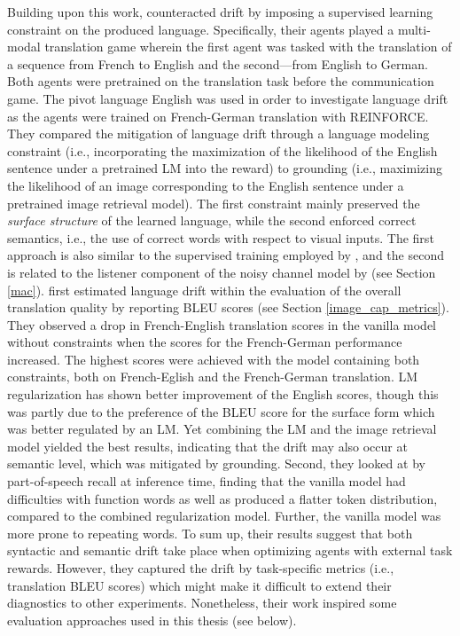 Building upon this work, \cite{lee2019countering} counteracted drift by imposing a supervised learning constraint on the produced language. Specifically, their agents played a multi-modal translation game wherein the first agent was tasked with the translation of a sequence from French to English and the second---from English to German. Both agents were pretrained on the translation task before the communication game. The pivot language English was used in order to investigate language drift as the agents were trained on French-German translation with REINFORCE. They compared the mitigation of language drift through a language modeling constraint (i.e., incorporating the maximization of the likelihood of the English sentence under a pretrained LM into the reward) to grounding (i.e., maximizing the likelihood of an image corresponding to the English sentence under a pretrained image retrieval model). The first constraint mainly preserved the \textit{surface structure} of the learned language, while the second enforced correct semantics, i.e., the use of correct words with respect to visual inputs. The first approach is also similar to the supervised training employed by \cite{lewis2017deal}, and the second is related to the listener component of the noisy channel model by \cite{lazaridou2020multi} (see Section \ref{mac}).
\cite{lee2019countering} first estimated language drift within the evaluation of the overall translation quality by reporting BLEU scores (see Section \ref{image_cap_metrics}). They observed a drop in French-English translation scores in the vanilla model without constraints when the scores for the French-German performance increased. The highest scores were achieved with the model containing both constraints, both on French-Eglish and the French-German translation. LM regularization has shown better improvement of the English scores, though this was partly due to the preference of the BLEU score for the surface form which was better regulated by an LM. Yet combining the LM and the image retrieval model yielded the best results, indicating that the drift may also occur at semantic level, which was mitigated by grounding. Second, they looked at by part-of-speech recall at inference time, finding that the vanilla model had difficulties with function words as well as produced a flatter token distribution, compared to the combined regularization model. Further, the vanilla model was more prone to repeating words. To sum up, their results suggest that both syntactic and semantic drift take place when optimizing agents with external task rewards. However, they captured the drift by task-specific metrics (i.e., translation BLEU scores) which might make it difficult to extend their diagnostics to other experiments. Nonetheless, their work inspired some evaluation approaches used in this thesis (see below).

